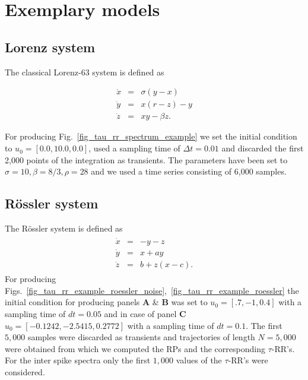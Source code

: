 \section{Exemplary models}
 
\subsection{Lorenz system}\label{sec_models_lorenz63}

The classical Lorenz-63 system \cite{lorenz1963} is defined as

\begin{equation}
\begin{array}{rcl}
\dot{x}&=&\sigma(y-x) \\
\dot{y}&=&x(r-z)-y \\
\dot{z}&=&xy - \beta z.
\end{array}
\label{eq_model_Lorenz63}
\end{equation}

\noindent For producing Fig.~\ref{fig_tau_rr_spectrum_example} we set the initial condition to $u_0=[0.0, 10.0, 0.0]$, used a sampling time of $\Delta t=0.01$ and discarded the first 
2,000 points of the integration as transients. The parameters have been set to 
$\sigma=10, \beta=8/3, \rho=28$ and we used a time series consisting of 6,000 samples.

\subsection{R\"ossler system}\label{sec_models_roessler}

The R\"ossler system \cite{roessler1976} is defined as
\begin{align}
\begin{array}{rcl}
\dot{x}&=&-y-z \\
\dot{y}&=&x+ay \\
\dot{z}&=&b+ z(x-c) .
\end{array}
\label{eq_model_roessler}
\end{align}
For producing Figs.~\ref{fig_tau_rr_example_roessler_noise},~\ref{fig_tau_rr_example_roessler} the initial condition for producing panels \textbf{A} \& \textbf{B} was set to $u_0=[.7, -1, 0.4]$ with a sampling time 
of $dt=0.05$ and in case of panel \textbf{C} $u_0=[-0.1242, -2.5415, 0.2772]$ with a sampling time of $dt=0.1$. The first $5,000$ samples were discarded as transients and trajectories of length $N=5,000$ were 
obtained from which we computed the RPs and the corresponding $\tau$-RR's. For the inter spike spectra only the first $1,000$ values of the $\tau$-RR's were considered.
 



 






